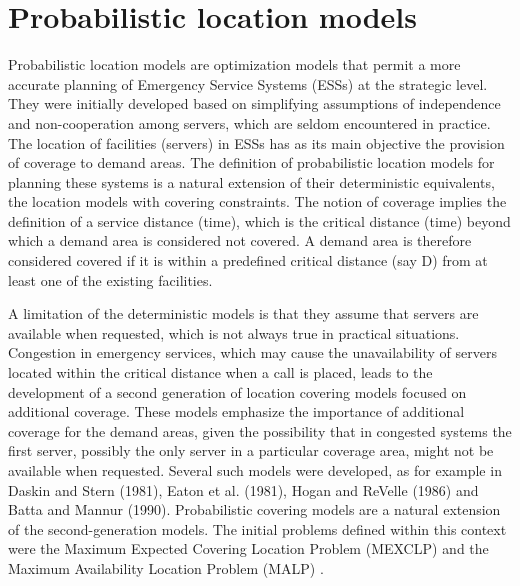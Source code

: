 \section{Probabilistic location models}
Probabilistic location models
are optimization models
that permit a more accurate planning
of Emergency Service Systems (ESSs)
at the strategic level.
They were initially developed
based on simplifying assumptions of independence
and non-cooperation among servers,
which are seldom encountered in practice.
The location of facilities (servers) in ESSs
has as its main objective
the provision of coverage to demand areas.
The definition of
probabilistic location models for planning these systems
is a natural extension
of their deterministic equivalents,
the location models with covering constraints.
The notion of coverage
implies
the definition of a service distance (time),
which is the critical distance (time)
beyond which a demand area is considered not covered.
A demand area is
therefore
considered covered
if
it is within a predefined critical distance (say D)
from at least one of the existing facilities.

A limitation of the deterministic models
is that
they assume
that servers are available when requested,
which is not always true in practical situations.
Congestion in emergency services,
which may cause
the unavailability
of servers located
within the critical distance
when a call is placed,
leads to
the development of
a second generation of location covering models
focused on additional coverage.
These models
emphasize the importance of additional coverage
for the demand areas,
given the possibility that
in congested systems
the first server,
possibly
the only server in a particular coverage area,
might not be available when requested.
Several such models were developed,
as for example in Daskin and Stern (1981),
Eaton et al. (1981),
Hogan and ReVelle (1986)
and Batta and Mannur (1990).
Probabilistic covering models
are a natural extension
of the second-generation models.
The initial problems
defined within this context
were
the Maximum Expected Covering Location Problem (MEXCLP)
\cite{daskin1983maximum} and
the Maximum Availability Location Problem (MALP)
\cite{revelle1989maximum}.
